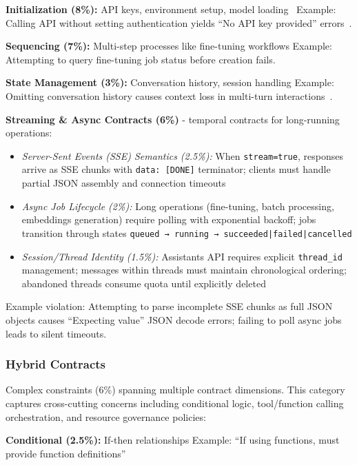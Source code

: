\documentclass[11pt]{article}
\begin{document}
\textbf{Initialization (8\%):} API keys, environment setup, model loading~\cite{githubautogpt1422}
Example: Calling API without setting authentication yields ``No API key provided'' errors~\cite{stackoverflow76322025}.

\textbf{Sequencing (7\%):} Multi-step processes like fine-tuning workflows
Example: Attempting to query fine-tuning job status before creation fails.

\textbf{State Management (3\%):} Conversation history, session handling
Example: Omitting conversation history causes context loss in multi-turn interactions~\cite{githublangchain18279}.

\textbf{Streaming \& Async Contracts (6\%)} - temporal contracts for long-running operations:
\begin{itemize}
    \item \textit{Server-Sent Events (SSE) Semantics (2.5\%):} When \texttt{stream=true}, responses arrive as SSE chunks with \texttt{data: [DONE]} terminator; clients must handle partial JSON assembly and connection timeouts~\cite{openai2023docs}
    \item \textit{Async Job Lifecycle (2\%):} Long operations (fine-tuning, batch processing, embeddings generation) require polling with exponential backoff; jobs transition through states \texttt{queued → running → succeeded|failed|cancelled}
    \item \textit{Session/Thread Identity (1.5\%):} Assistants API requires explicit \texttt{thread\_id} management; messages within threads must maintain chronological ordering; abandoned threads consume quota until explicitly deleted
\end{itemize}

Example violation: Attempting to parse incomplete SSE chunks as full JSON objects causes ``Expecting value'' JSON decode errors; failing to poll async jobs leads to silent timeouts.

\subsubsection{Hybrid Contracts}

Complex constraints (6\%) spanning multiple contract dimensions. This category captures cross-cutting concerns including conditional logic, tool/function calling orchestration, and resource governance policies:

\textbf{Conditional (2.5\%):} If-then relationships
Example: ``If using functions, must provide function definitions''~\cite{githubopenai1795}
\end{document}
